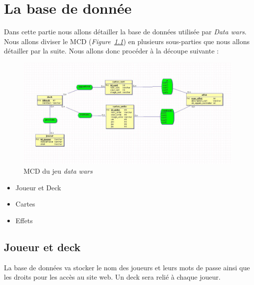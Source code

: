 \documentclass[a4paper, titlepage]{livret}
\begin{document}
\chapter{La base de donnée}
    Dans cette partie nous allons détailler la base de données utilisée par \textit{Data wars}. Nous allons diviser le MCD (\textit{Figure~\ref{fig1}}) en plusieurs sous-parties que nous allons détailler par la suite. Nous allons donc procéder à la découpe suivante : 
    
    \begin{figure}[th]
      \begin{center}
        \includegraphics[scale=0.4]{Assets/MCD.png}
        \caption{MCD du jeu \textit{data wars}}
        \label{fig1}
      \end{center}
    \end{figure}
    
    \begin{itemize}
      \item Joueur et Deck
      \item Cartes
      \item Effets
    \end{itemize}

    \section{Joueur et deck}
      La base de données va stocker le nom des joueurs et leurs mots de passe ainsi que les droits pour les accès au site web. Un deck sera relié à chaque joueur.
    
\end{document}
